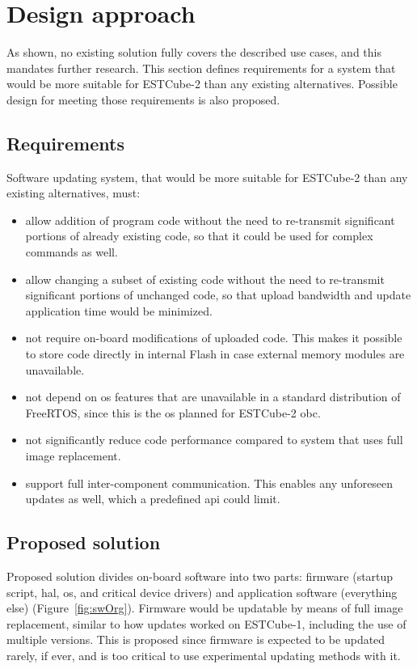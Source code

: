 \newpage
\section{Design approach}
\label{s:design}

As shown, no existing solution fully covers the described use cases, and this mandates further research. This section defines requirements for a system that would be more suitable for ESTCube-2 than any existing alternatives. Possible design for meeting those requirements is also proposed.

\subsection{Requirements}

Software updating system, that would be more suitable for ESTCube-2 than any existing alternatives, must:

\begin{itemize}
	\item allow addition of program code without the need to re-transmit significant portions of already existing code, so that it could be used for complex commands as well.
	\item allow changing a subset of existing code without the need to re-transmit significant portions of unchanged code, so that upload bandwidth and update application time would be minimized.
	\item not require on-board modifications of uploaded code. This makes it possible to store code directly in internal Flash in case external memory modules are unavailable.
	\item not depend on \gls{os} features that are unavailable in a standard distribution of Free\-RTOS, since this is the \gls{os} planned for ESTCube-2 \gls{obc}.
	\item not significantly reduce code performance compared to system that uses full image replacement.
	\item support full inter-component communication. This enables any unforeseen updates as well, which a predefined \gls{api} could limit.
\end{itemize}

\subsection{Proposed solution}

Proposed solution divides on-board software into two parts: firmware (startup script, \gls{hal}, \gls{os}, and critical device drivers) and application software (everything else) (Figure~\ref{fig:swOrg}). Firmware would be updatable by means of full image replacement, similar to how updates worked on ESTCube-1, including the use of multiple versions. This is proposed since firmware is expected to be updated rarely, if ever, and is too critical to use experimental updating methods with it.

